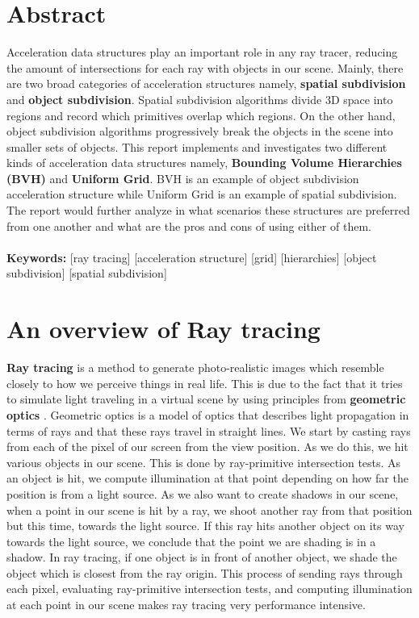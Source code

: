 \documentclass[11pt,a4paper]{article}
\begin{document}
\section{Abstract}
Acceleration data structures play an important role in any ray tracer, reducing the amount of intersections for each ray with objects in our scene. Mainly, there are two broad categories of acceleration structures namely, \textbf{spatial subdivision} and \textbf{object subdivision}. Spatial subdivision algorithms divide 3D space into regions and record which primitives overlap which regions. On the other hand, object subdivision algorithms progressively break the objects in the scene into smaller sets of objects. This report implements and investigates two different kinds of acceleration data structures namely, \textbf{Bounding Volume Hierarchies (BVH)} and \textbf{Uniform Grid}. BVH is an example of object subdivision acceleration structure while Uniform Grid is an example of spatial subdivision. The report would further analyze in what scenarios these structures are preferred from one another and what are the pros and cons of using either of them.
\\~\\
\noindent
\textbf{Keywords:} [ray tracing] [acceleration structure] [grid] [hierarchies] [object subdivision] [spatial subdivision]

\section{An overview of Ray tracing}
\textbf{Ray tracing} is a method to generate photo-realistic images which resemble closely to how we perceive things in real life. This is due to the fact that it tries to simulate light traveling in a virtual scene by using principles from \textbf{geometric optics} \cite{geometricoptics}. Geometric optics is a model of optics that describes light propagation in terms of rays and that these rays travel in straight lines.  We start by casting rays from each of the pixel of our
screen from the view position. As we do this, we hit various objects in our scene. This is done by
ray-primitive intersection tests. As an object is hit, we compute illumination at that point depending
on how far the position is from a light source. As we also want to create shadows in our scene, when
a point in our scene is hit by a ray, we shoot another ray from that position but this time, towards
the light source. If this ray hits another object on its way towards the light source, we conclude that
the point we are shading is in a shadow. In ray tracing, if one object is in front of another object, we
shade the object which is closest from the ray origin. This process of sending rays through each pixel,
evaluating ray-primitive intersection tests, and computing illumination at each point in our scene makes
ray tracing very performance intensive.
\end{document}
